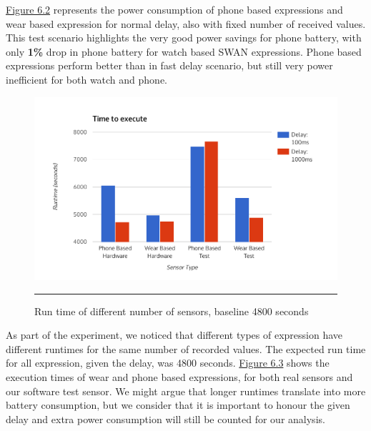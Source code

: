 \hyperref[fig:phone_vs_wear_1000]{Figure 6.2} represents the power consumption of phone based expressions and wear based expression for normal delay, also
with fixed number of received values. This test scenario highlights the very good power savings for phone battery, with only \textbf{1\%} drop in phone battery for watch based SWAN
expressions. Phone based expressions perform better than in fast delay scenario, but still very power inefficient for both watch and phone.

 \begin{figure}[htbp]
  \centering
    \includegraphics[scale=0.8]{Figures/execution_times.pdf}
    \rule{35em}{0.5pt}
  \caption[Run time of different number of sensors, baseline 4800 seconds]{Run time of different number of sensors, baseline 4800 seconds}
  \label{fig:execution_times}
\end{figure}

As part of the experiment, we noticed that different types of expression have different runtimes for the same number of recorded values. The expected run time for all expression,
given the delay, was 4800 seconds. \hyperref[fig:execution_times]{Figure 6.3} shows the execution times of wear and phone based expressions, for both real sensors and our software test sensor.
We might argue that longer runtimes translate into more battery consumption, but we consider that it is important to honour the given delay and extra power consumption will still be counted for 
our analysis.

